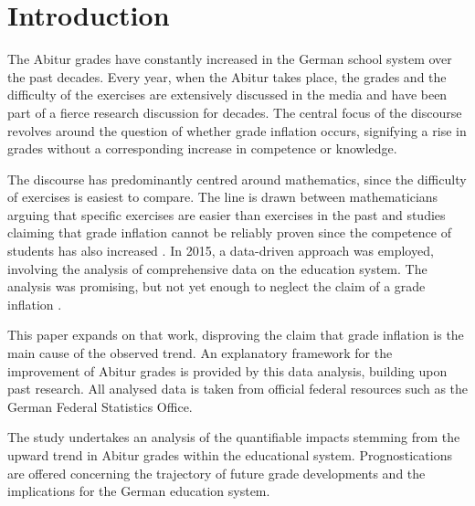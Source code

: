 \section{Introduction}
The Abitur grades have constantly increased in the German school system over the past decades. Every year, when the Abitur takes place, the grades and the difficulty of the exercises are extensively discussed in the media and have been part of a fierce research discussion for decades. The central focus of the discourse revolves around the question of whether grade inflation occurs, signifying a rise in grades without a corresponding increase in competence or knowledge.

The discourse has predominantly centred around mathematics, since the difficulty of exercises is easiest to compare. The line is drawn between mathematicians arguing that specific exercises are easier than exercises in the past \cite{kuhnel2015modellierungskompetenz} \cite{JahnkeKleinKühnelSonarSpindler+2014+115+122} \cite{lemmermeyer2019zentralabitur} and studies claiming that grade inflation cannot be reliably proven since the competence of students has also increased \cite{Schleithoff+2015+3+26}.
In 2015, a data-driven approach was employed, involving the analysis of comprehensive data on the education system. The analysis was promising, but not yet enough to neglect the claim of a grade inflation \cite{doi:10.7788/bue-2015-0407}.

This paper expands on that work, disproving the claim that grade inflation is the main cause of the observed trend. An explanatory framework for the improvement of Abitur grades is provided by this data analysis, building upon past research. All analysed data is taken from official federal resources such as the German Federal Statistics Office.

The study undertakes an analysis of the quantifiable impacts stemming from the upward trend in Abitur grades within the educational system. Prognostications are offered concerning the trajectory of future grade developments and the implications for the German education system.

